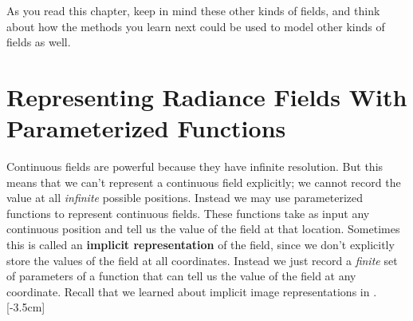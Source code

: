 As you read this chapter, keep in mind these other kinds of fields, and think about how the methods you learn next could be used to model other kinds of fields as well.


\section{Representing Radiance Fields With Parameterized Functions}

Continuous fields are powerful because they have infinite resolution. But this means that we can't represent a continuous field explicitly; we cannot record the value at all \textit{infinite} possible positions. Instead we may use parameterized functions to represent continuous fields. These functions take as input any continuous position and tell us the value of the field at that location. Sometimes this is called an \textbf{implicit representation} of the field, since we don't explicitly store the values of the field at all coordinates. Instead we just record a \textit{finite} set of parameters of a function that can tell us the value of the field at any coordinate. Recall that we learned about implicit image representations in \sect{\ref{sec:implicit_image_representations}}. [-3.5cm]

